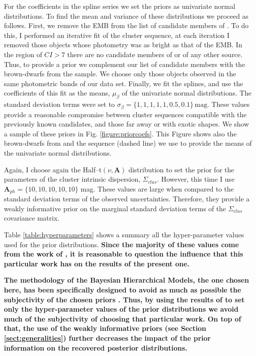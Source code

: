 For the coefficients in the spline series we set the priors as univariate normal distributions. To find the mean and variance of these distributions we proceed as follows. First, we remove the EMB from the list of candidate members of \citet{Bouy2015}. To do this, I performed an iterative fit of the cluster sequence, at each iteration I removed those objects whose photometry was  as bright as that of the EMB. In the region of $CI > 7$ there are no candidate members of \citet{Bouy2015} or of any other source. Thus, to provide a prior we complement our list of candidate members with the brown-dwarfs from the \citet{Faherty2012} sample. We choose only those objects observed in the same photometric bands of our data set. Finally, we fit the splines, and use the coefficients of this fit as the means, $\mu_{\beta}$ of the univariate normal distributions. The standard deviation terms were set to $\sigma_{\beta}=\{1,1,1,1,1,0.5,0.1\}\,\mathrm{mag}$. These values provide a reasonable compromise between cluster sequences compatible with the previously known candidates, and those far away or with exotic shapes. We show a sample of these priors in Fig. \ref{figure:priorcoefs}. This Figure shows also the brown-dwarfs from \citet{Faherty2012} and the sequence (dashed line) we use to provide the means of the univariate normal distributions.

Again, I choose again the Half--t$(\nu,\boldsymbol{A})$ distribution to set the prior for the parameters of the cluster intrinsic dispersion, $\Sigma_{clus}$.  However, this time I use  $\boldsymbol{A}_{ph}=\{10,10,10,10,10\}$ mag. These values are large when compared to the standard deviation terms of the observed uncertainties. Therefore, they provide a weakly informative prior on the marginal standard deviation terms of the $\Sigma_{clus}$ covariance matrix.

Table \ref{table:hyperparameters} shows a summary all the hyper-parameter values used for the prior distributions. \textbf{Since the majority of these values come from the work of \citet{Bouy2015}, it is reasonable to question the influence that this particular work has on the results of the present one.}

\textbf{The methodology of the Bayesian Hierarchical Models, the one chosen here, has been specifically designed to avoid as much as possible the subjectivity of the chosen priors \citep{Gelman2006}. Thus, by using the results of \citet{Bouy2015} to set only the hyper-parameter values of the prior distributions we avoid much of the subjectivity of choosing that particular work. On top of that, the use of the weakly informative priors (see Section \ref{sect:generalities}) further decreases the impact of the prior information on the recovered posterior distributions.}

